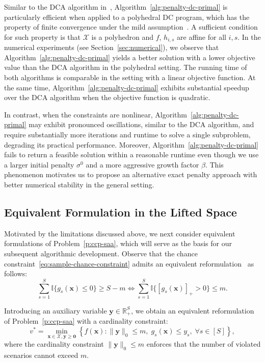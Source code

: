 \documentclass[11pt]{article}
\def\bs{\boldsymbol}
\def\ind{\mathbb{I}}
\def\Re{\mathbb{R}}
\def\X{\mathcal{X}}
\begin{document}
Similar to the DCA algorithm in~\cite{wang2025proximal}, Algorithm~\ref{alg:penalty-dc-primal} is particularly efficient when applied to a polyhedral DC program, which has the property of finite convergence under the mild assumption~\cite[theorem 6]{tao1997convex}. A sufficient condition for such property is that $\X$ is a polyhedron and $f$, $h_{i,s}$ are affine for all $i,s$. In the numerical experiments (see Section~\ref{sec:numerical}), we observe that Algorithm~\ref{alg:penalty-dc-primal} yields a better solution with a lower objective value than the DCA algorithm in the polyhedral setting. The running time of both algorithms is comparable in the setting with a linear objective function. At the same time, Algorithm~\ref{alg:penalty-dc-primal} exhibits substantial speedup over the DCA algorithm when the objective function is quadratic. 

In contrast, when the constraints are nonlinear, Algorithm~\ref{alg:penalty-dc-primal} may exhibit pronounced oscillations, similar to the DCA algorithm, and require substantially more iterations and runtime to solve a single subproblem, degrading its practical performance. Moreover, Algorithm~\ref{alg:penalty-dc-primal} fails to return a feasible solution within a reasonable runtime even though we use a larger initial penalty $\sigma^0$ and a more aggressive growth factor $\beta$. This phenomenon motivates us to propose an alternative exact penalty approach with better numerical stability in the general setting.

\subsection{Equivalent Formulation in the Lifted Space}

Motivated by the limitations discussed above, we next consider equivalent formulations of Problem~\eqref{p:ccp-saa}, which will serve as the basis for our subsequent algorithmic development. Observe that the chance constraint~\eqref{eq:sample-chance-constraint} admits an equivalent reformulation~\cite{zhou20250} as follows:
\[
\sum^S_{s=1} \ind\{g_s(\bs{x})\leq 0\} \geq S-m \Longleftrightarrow \sum^S_{s=1} \ind\{[g_s(\bs{x})]_+> 0\} \leq m.
\]

Introducing an auxiliary variable $\bs{y} \in \Re^S_+$, we obtain an equivalent reformulation of Problem~\eqref{p:ccp-saa} with a cardinality constraint:
\begin{equation*} 
v^* = \min_{\bs{x}\in\X, \bs{y} \geq \bs{0}} \left \{ f(\bs{x}): \|\bs{y}\|_0 \leq m, \; g_s(\bs{x}) \leq y_s, \; \forall s\in [S]\right\},
\end{equation*}
where the cardinality constraint $\|\bs{y}\|_0 \leq m$ enforces that the number of violated scenarios cannot exceed $m$.
\end{document}
